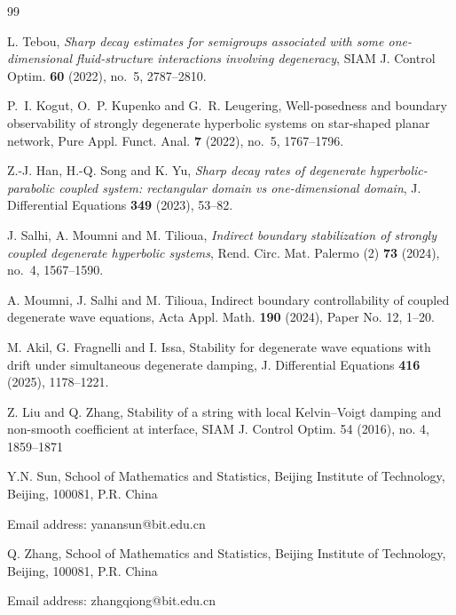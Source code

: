 \documentclass[twoside]{article}
\theoremstyle{noparens}
\theoremstyle{definition}
\numberwithin{equation}{section}
\numberwithin{figure}{section}
\begin{document}
\begin{thebibliography}{99}
{ L. Tebou, \textit{Sharp decay estimates for semigroups associated with some one-dimensional fluid-structure interactions involving degeneracy}, SIAM J. Control Optim. {\bf 60} (2022), no.~5, 2787--2810.

 P.~I. Kogut, O.~P. Kupenko and G.~R. Leugering, Well-posedness and boundary observability of strongly degenerate hyperbolic systems on star-shaped planar network, Pure Appl. Funct. Anal. {\bf 7} (2022), no.~5, 1767--1796.

 Z.-J. Han, H.-Q. Song and K. Yu, \textit{Sharp decay rates of degenerate hyperbolic-parabolic coupled system: rectangular domain vs one-dimensional domain}, J. Differential Equations {\bf 349} (2023), 53--82.

 J. Salhi, A. Moumni and M. Tilioua, \textit{Indirect boundary stabilization of strongly coupled degenerate hyperbolic systems}, Rend. Circ. Mat. Palermo (2) {\bf 73} (2024), no.~4, 1567--1590.

 A. Moumni, J. Salhi and M. Tilioua, Indirect boundary controllability of coupled degenerate wave equations, Acta Appl. Math. {\bf 190} (2024), Paper No. 12, 1--20.

 M. Akil, G. Fragnelli and I. Issa, Stability for degenerate wave equations with drift under simultaneous degenerate damping, J. Differential Equations {\bf 416} (2025), 1178--1221.

 Z. Liu and Q. Zhang, Stability of a string with local Kelvin–Voigt damping and non-smooth coefficient at interface, SIAM J. Control Optim.
54 (2016), no. 4, 1859–1871

}

\end{thebibliography}

Y.N. Sun, School of Mathematics and Statistics, Beijing Institute of Technology, Beijing, 100081, P.R. China

Email address: yanansun@bit.edu.cn

Q. Zhang, 
School of Mathematics and Statistics, Beijing Institute of Technology, Beijing, 100081, P.R. China

Email address: zhangqiong@bit.edu.cn
\end{document}
